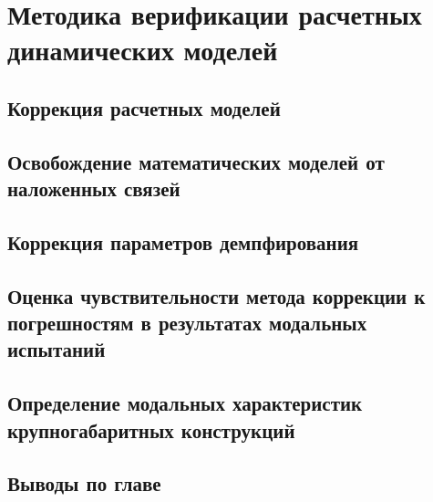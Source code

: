 \chapter{Методика верификации расчетных динамических моделей}

\section{Коррекция расчетных моделей} 

\section{Освобождение математических моделей от наложенных связей}

\section{Коррекция параметров демпфирования}

\section{Оценка чувствительности метода коррекции к погрешностям в результатах модальных испытаний}

\section{Определение модальных характеристик крупногабаритных конструкций}

\section{Выводы по главе \thechapter}